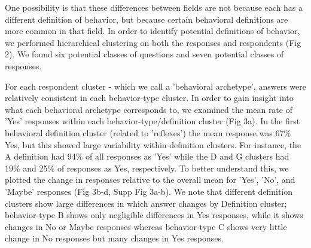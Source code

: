 \documentclass[a4paper, 11pt]{article}
\begin{document}
One possibility is that these differences between fields are not because each has a different definition of behavior, but because certain behavioral definitions are more common in that field. In order to identify potential definitions of behavior, we performed hierarchical clustering on both the responses and respondents (Fig 2). We found six potential classes of questions and seven potential classes of responses. 

For each respondent cluster - which we call a 'behavioral archetype', answers were relatively consistent in each behavior-type cluster. In order to gain insight into what each behavioral archetype corresponds to, we examined the mean rate  of 'Yes' responses within each behavior-type/definition cluster (Fig 3a). In the first behavioral definition cluster (related to 'reflexes') the mean response was 67\% Yes, but this showed large variability within definition clusters. For instance, the A definition had 94\% of all responses as 'Yes' while the D and G clusters had 19\% and 25\% of responses as Yes, respectively. To better understand this, we plotted the change in responses relative to the overall mean for 'Yes', 'No', and 'Maybe' responses (Fig 3b-d, Supp Fig 3a-b). We note that different definition clusters show large differences in which answer changes by Definition cluster; behavior-type B shows only negligible differences in Yes responses, while it shows changes in No or Maybe responses whereas behavior-type C shows very little change in No responses but many changes in Yes responses.
\end{document}
